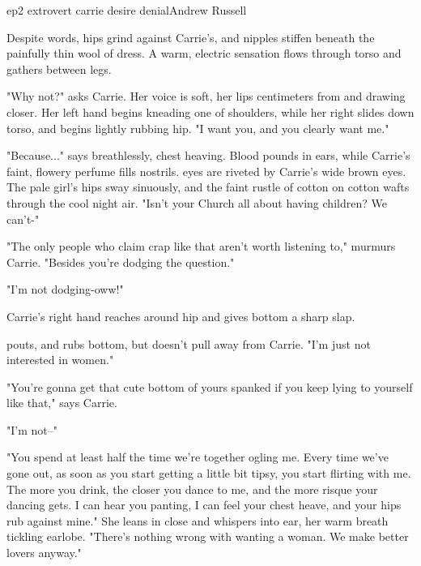 \documentclass{book}
\begin{document}
\begin{childnode}{ep2 extrovert carrie desire denial}{Andrew Russell}

    Despite \hisher{} words, \names{} hips grind against Carrie's, and \hisher{} nipples stiffen beneath the painfully thin wool of \hisher{} dress. A warm, electric sensation flows through \hisher{}
    torso and gathers between \hisher{} legs.

    "Why not?" asks Carrie. Her voice is soft, her lips centimeters from \names{} and drawing closer. Her left hand begins kneading one of \names{} shoulders, while her right
    slides down \names{} torso, and begins lightly rubbing \names{} hip. "I want you, and you clearly want me."

    "Because..." says \name{} breathlessly, \hisher{} chest heaving. Blood pounds in \hisher{} ears, while Carrie's faint, flowery perfume fills \hisher{} nostrils. \HisHer{} eyes are riveted by
    Carrie's wide brown eyes. The pale girl's hips sway sinuously, and the faint rustle of cotton on cotton wafts through the cool night air. "Isn't your Church all about having children? We can't-"

    "The only people who claim crap like that aren't worth listening to," murmurs Carrie. "Besides you're dodging the question."

    "I'm not dodging-oww!"

    Carrie's right hand reaches around \names{} hip and gives \hisher{}  bottom a sharp slap. 

    \name{} pouts, and rubs \hisher{} bottom, but doesn't pull away from Carrie. "I'm just not interested in women."

    "You're gonna get that cute bottom of yours spanked if you keep lying to yourself like that," says Carrie.

    "I'm not--"

    "You spend at least half the time we're together ogling me. Every time we've gone out, as soon as you start getting a little bit tipsy, you start flirting with me. The more you drink, the closer
    you dance to me, and the
    more risque your dancing gets. I can hear you panting, I can feel your chest heave, and your hips rub against mine." She leans in close and whispers into \names{} ear, her warm breath tickling 
    \names{} earlobe. "There's nothing wrong with wanting a woman. We make better lovers anyway."



\end{childnode}
\end{document}
